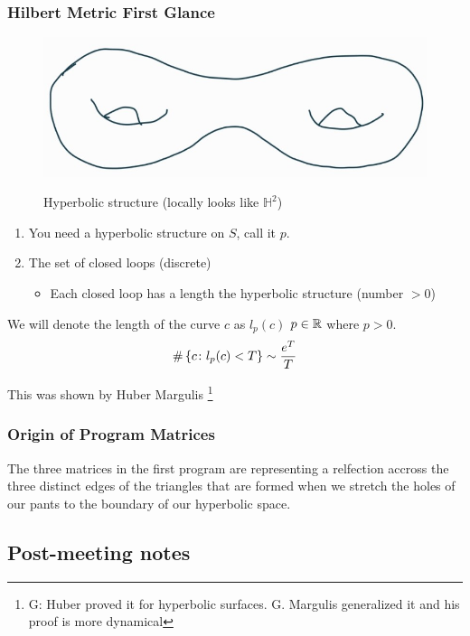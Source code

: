 \documentclass{amsart}
\def\GM #1{\footnote{\color{magenta} G: #1}}
\begin{document}
	\subsubsection*{Hilbert Metric First Glance}
	
	\begin{figure}[h]
		\includegraphics[width=0.5\linewidth]{g2_torus}
		\label{fig:g2_torus}
		\caption{Hyperbolic structure (locally looks like $\mathbb{H}^2$)}
	\end{figure}
	
	\begin{enumerate}
		\item You need a hyperbolic structure on $S$, call it  $p$.
		\item The set of closed loops (discrete)
		\begin{itemize}
			\item Each closed loop has a length \wrt the hyperbolic structure (number $> 0$)
		\end{itemize}
	\end{enumerate}
	
	We will denote the length of the curve $c$ as $l_p(c)$ \wrt $p \in \mathbb{R}$ where $p > 0$.
	\begin{equation*}
		\# \left\{c \colon l_p(c) < T\right\} \sim \frac{e^T}{T}
	\end{equation*}
	\begin{remark}
		This was shown by Huber Margulis \GM{Huber proved it for hyperbolic surfaces. G. Margulis generalized it and his proof is more dynamical}
	\end{remark}
	
	\subsubsection*{Origin of Program Matrices}
	
	The three matrices in the first program are representing a relfection accross the three distinct edges of the triangles that are formed when we stretch the holes of our pants to the boundary of our hyperbolic space. 
	
	
\subsection{Post-meeting notes}
\end{document}
